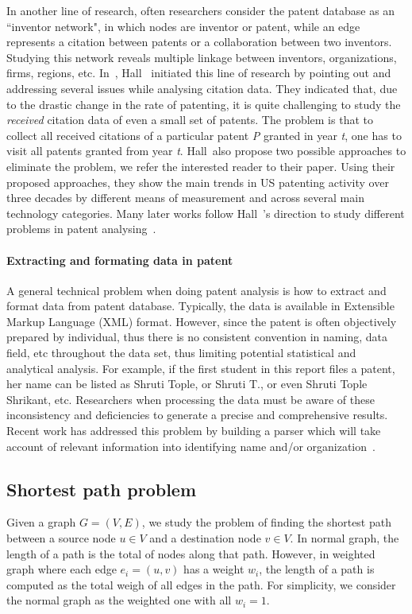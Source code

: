 In another line of research, often researchers consider the patent database as
an ``inventor network", in which nodes are inventor or patent, while an edge
represents a citation between patents or a collaboration between two inventors.
Studying this network reveals multiple linkage between inventors,
organizations, firms, regions, etc. In~\cite{Hall01thenber}, Hall~\etal
initiated this line of research by pointing out and addressing several issues
while analysing citation data. They indicated that, due to the drastic change
in the rate of patenting, it is quite challenging to study the {\em received}
citation data of even a small set of patents. The problem is that to collect
all received citations of a particular patent {\em P} granted in year {\em t},
one has to visit all patents granted from year {\em t}. Hall~\etal also propose
two possible approaches to eliminate the problem, we refer the interested
reader to their paper. Using their proposed approaches, they show the main
trends in US patenting activity over three decades by different means of
measurement and across several main technology categories. Many later works
follow Hall~\etal's direction to study different problems in patent
analysing~\cite{Leskovec:2005, Hall2000, leskovec2007graph, Acs2002}.

\paragraph{Extracting and formating data in patent} A general technical problem
when doing patent analysis is how to extract and format data from patent
database. Typically, the data is available in Extensible Markup Language (XML)
format. However, since the patent is often objectively prepared by individual,
thus there is no consistent convention in naming, data field, etc throughout
the data set, thus limiting potential statistical and analytical analysis. For example, if the first student in this report files a patent, her name can be listed as Shruti Tople, or Shruti T., or even Shruti Tople Shrikant, etc. Researchers when processing the data must be aware of these inconsistency and deficiencies to generate a precise and comprehensive results. Recent work has addressed this problem by building a parser which will take account of relevant information into identifying name and/or organization~\cite{formattingpatentdata, disambiguation, Torvik:2009}.
% 
\subsection{Shortest path problem}
Given a graph $G = (V, E)$, we study the problem of finding the shortest path between a source node $u \in V$ and a destination node $v \in V$. In normal graph, the length of a path is the total of nodes along that path. However, in weighted graph where each edge $e_i = (u, v)$ has a weight $w_i$, the length of a path is computed as the total weigh of all edges in the path. For simplicity, we consider the normal graph as the weighted one with all $w_i=1$.


